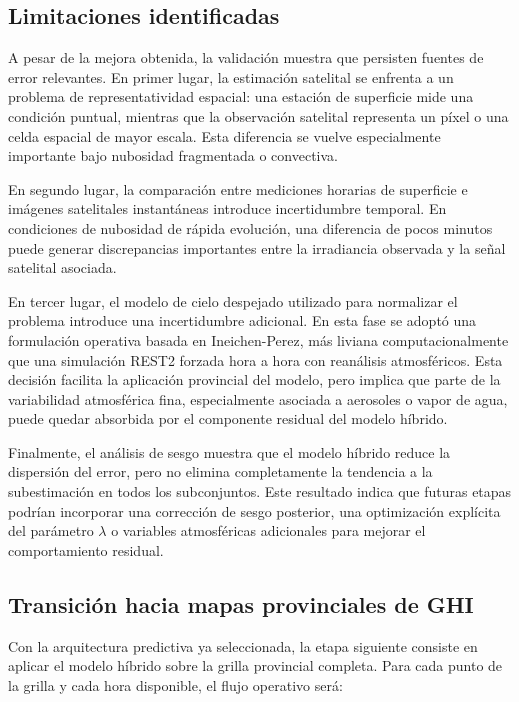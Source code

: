 \documentclass[../main.tex]{subfiles}
\begin{document}
\subsection{Limitaciones identificadas}

A pesar de la mejora obtenida, la validación muestra que persisten fuentes de error relevantes. En primer lugar, la estimación satelital se enfrenta a un problema de representatividad espacial: una estación de superficie mide una condición puntual, mientras que la observación satelital representa un píxel o una celda espacial de mayor escala. Esta diferencia se vuelve especialmente importante bajo nubosidad fragmentada o convectiva.

En segundo lugar, la comparación entre mediciones horarias de superficie e imágenes satelitales instantáneas introduce incertidumbre temporal. En condiciones de nubosidad de rápida evolución, una diferencia de pocos minutos puede generar discrepancias importantes entre la irradiancia observada y la señal satelital asociada.

En tercer lugar, el modelo de cielo despejado utilizado para normalizar el problema introduce una incertidumbre adicional. En esta fase se adoptó una formulación operativa basada en Ineichen-Perez, más liviana computacionalmente que una simulación REST2 forzada hora a hora con reanálisis atmosféricos. Esta decisión facilita la aplicación provincial del modelo, pero implica que parte de la variabilidad atmosférica fina, especialmente asociada a aerosoles o vapor de agua, puede quedar absorbida por el componente residual del modelo híbrido.

Finalmente, el análisis de sesgo muestra que el modelo híbrido reduce la dispersión del error, pero no elimina completamente la tendencia a la subestimación en todos los subconjuntos. Este resultado indica que futuras etapas podrían incorporar una corrección de sesgo posterior, una optimización explícita del parámetro $\lambda$ o variables atmosféricas adicionales para mejorar el comportamiento residual.

\subsection{Transición hacia mapas provinciales de GHI}

Con la arquitectura predictiva ya seleccionada, la etapa siguiente consiste en aplicar el modelo híbrido sobre la grilla provincial completa. Para cada punto de la grilla y cada hora disponible, el flujo operativo será:
\end{document}
